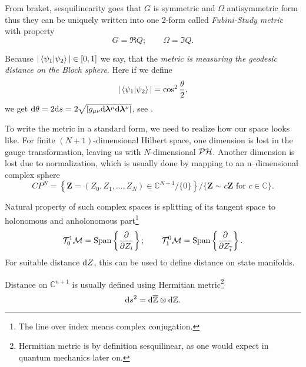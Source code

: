 From braket, sesquilinearity goes that $G$ is symmetric and $\Omega$ antisymmetric form thus they can be uniquely written into one 2-form called \emph{Fubini-Study metric} with property
\begin{equation}
    G=\Re Q ;\qquad \Omega=\Im Q.
\end{equation}

Because $|\braket{\psi_1|\psi_2}|\in[0,1]$ we say, that the \emph{metric is measuring the geodesic distance on the Bloch sphere}. Here if we define
\begin{equation}
    |\braket{\psi_1|\psi_2}|=\cos^2 \frac{\theta}{2},
\end{equation}
we get $\mathrm{d} \theta= 2\mathrm{d} s=2\sqrt{|g_{\mu\nu}\mathrm{d} {\bm\lambda}^\mu\mathrm{d} {\bm\lambda}^\nu|}$, see \citet{cheng_quantum_2013}.

To write the metric in a standard form, we need to realize how our space looks like. For finite $(N+1)$-dimensional Hilbert space, one dimension is lost in the gauge transformation, leaving us with $N$-dimensional $\mathcal{PH}$. Another dimension is lost due to normalization, which is usually done by mapping to an n--dimensional complex sphere
$$CP^N= \left\{ \bm Z=(Z_0,Z_1,\dots,Z_N)\in \mathbb{C}^{N+1}/\{0\} \right\}\Big/ \{\bm Z\sim c\bm Z \text{ for } c\in \mathbb{C}\}.$$

Natural property of such complex spaces is splitting of its tangent space to holonomous and anholonomous part\footnote{The line over index means complex conjugation.}
$$\mathcal T^1_0\mathcal{M}=\text{Span}\left\{\frac{\partial}{\partial Z_i}\right\}; \qquad \mathcal T^0_1\mathcal{M}=\text{Span}\left\{\frac{\partial}{\partial Z_{\overline{i}}}\right\}.$$
For suitable distance $\mathrm{d} Z$, this can be used to define distance on state manifolds.


Distance on $\mathbb{C}^{n+1}$ is usually defined using Hermitian metric\footnote{Hermitian metric is by definition sesquilinear, as one would expect in quantum mechanics later on.} 
\begin{equation}
    \mathrm{d} s^2 = \mathrm{d} \overline{\mathbb{Z}} \otimes \mathrm{d} \mathbb{Z}.
\label{eq:metricdistancePH}
\end{equation}




